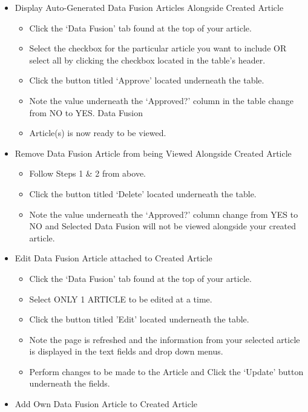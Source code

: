 \documentclass[11pt]{article} %
\begin{document}
\begin{itemize}
\item Display Auto-Generated Data Fusion Articles Alongside Created Article
	\begin{itemize}
	\itemindent 10pt
	\item Click the ‘Data Fusion’ tab found at the top of your article.
	\item Select the checkbox for the particular article you want to include OR select all by clicking the checkbox located in the table’s header.
	\item Click the button titled ‘Approve’ located underneath the table.
	\item Note the value underneath the ‘Approved?’ column in the table change from NO to YES. Data Fusion 	\item Article(s) is now ready to be viewed.
	\end{itemize}
\item Remove Data Fusion Article from being Viewed Alongside Created Article
	\begin{itemize}
	\itemindent 10pt
    	\item Follow Steps 1 \& 2 from above.
    	\item Click the button titled ‘Delete’ located underneath the table.
	\item Note the value underneath the ‘Approved?’ column change from YES to NO and Selected Data Fusion will not be viewed alongside your created article.
	\end{itemize}
\item Edit Data Fusion Article attached to Created Article
	\begin{itemize}
	\itemindent 10pt
    	\item Click the ‘Data Fusion’ tab found at the top of your article.
    	\item Select ONLY 1 ARTICLE to be edited at a time.
	\item Click the button titled ’Edit’ located underneath the table.
	\item Note the page is refreshed and the information from your selected article is displayed in the text fields and drop down menus.
	\item Perform changes to be made to the Article and Click the ‘Update’ button underneath the fields.
	\end{itemize}
\item Add Own Data Fusion Article to Created Article
	\begin{itemize}
	\itemindent 10pt

\end{itemize}
\end{itemize}
\end{document}
